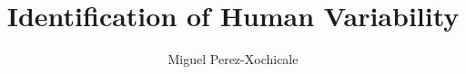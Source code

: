 \documentclass[10pt,journal,compsoc]{IEEEtran}
\begin{document}
%
\title{Identification of Human Variability}
%
%
%
%

\author{Miguel Perez-Xochicale
}
\end{document}
